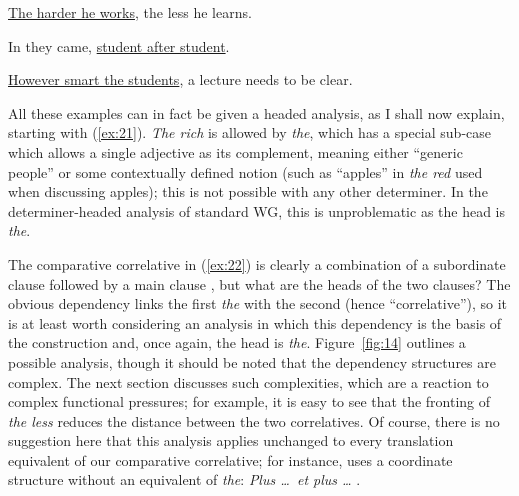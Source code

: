 \documentclass[output=paper
 	        ,biblatex
                ,babelshorthands
                ,newtxmath
                ,draftmode
                ,colorlinks, citecolor=brown
]{langscibook}
\begin{document}
\ex \label{ex:22} \underline{The harder he works}, the less he learns. 

\ex \label{ex:23} In they came, \underline{student after student}. 

\ex \label{ex:24} \underline{However smart the students}, a lecture needs to be clear. 
\zl

All these examples can in fact be given a headed analysis, as I shall now explain, starting with (\ref{ex:21}). \emph{The rich} is allowed by \emph{the}, which has a special sub-case which allows a single adjective as its complement, meaning either ``generic people'' or some contextually defined notion (such as ``apples'' in \emph{the red} used when discussing apples); this is not possible with any other determiner. In the determiner-headed analysis of standard WG, this is unproblematic as the head is \emph{the}.

The comparative correlative in (\ref{ex:22}) is clearly a combination of a subordinate clause followed by a main clause \citep{CJ99a-u}, but what are the heads of the two clauses? The obvious dependency links the first \emph{the} with the second (hence ``correlative''), so it is at least worth considering an analysis in which this dependency is the basis of the construction and, once again, the head is \emph{the}. Figure~\ref{fig:14} outlines a possible analysis, though it should be noted that the dependency structures are complex. The next section discusses such complexities, which are a reaction to complex functional pressures; for example, it is easy to see that the fronting of \emph{the less} reduces the distance between the two correlatives. Of course, there is no suggestion here that this analysis applies unchanged to every translation equivalent of our comparative correlative; for instance,  uses a coordinate structure without an equivalent of \emph{the}: \emph{Plus \dots\ et plus \dots} \citep{Abeille:Borsley:08}.
\end{document}
